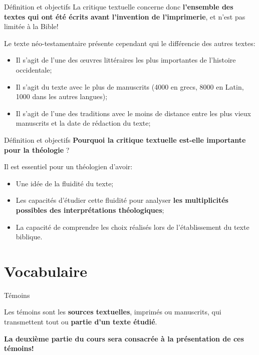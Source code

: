 \documentclass[11pt]{beamer}
\begin{document}
\begin{frame}{Définition et objectifs}
La critique textuelle concerne donc \textbf{l'ensemble des textes qui ont été écrits avant l'invention de l'imprimerie}, et n'est pas limitée à la Bible!\\

\begin{block}{}
    Le texte néo-testamentaire présente cependant qui le différencie des autres textes:
    \begin{itemize}
\item Il s'agit de l'une des \oe{}uvres littéraires les plus importantes de l'histoire occidentale;
\item Il s'agit du texte avec le plus de manuscrits (4000 en grecs, 8000 en Latin, 1000 dans les autres langues);
\item Il s'agit de l'une des traditions avec le moins de distance entre les plus vieux manuscrits et la date de rédaction du texte;
    \end{itemize}
\end{block}

\end{frame}

\begin{frame}{Définition et objectifs}
\textbf{Pourquoi la critique textuelle est-elle importante pour la théologie} ?

\begin{alertblock}{}
Il est essentiel pour un théologien d'avoir:
\begin{itemize}
\item Une idée de la fluidité du texte;
\item Les capacités d'étudier cette fluidité pour analyser \textbf{les multiplicités possibles des interprétations théologiques};
\item La capacité de comprendre les choix réalisés lors de l'établissement du texte biblique.
\end{itemize}
\end{alertblock}

\end{frame}

\section{Vocabulaire}

\begin{frame}{Témoins}
    \begin{alertblock}{}
    Les témoins sont les \textbf{sources textuelles}, imprimés ou manuscrits, qui transmettent tout ou \textbf{partie d’un texte étudié}.
    \end{alertblock}
    \vfill
    \textbf{La deuxième partie du cours sera consacrée à la présentation de ces témoins!}
\end{frame}
\end{document}
